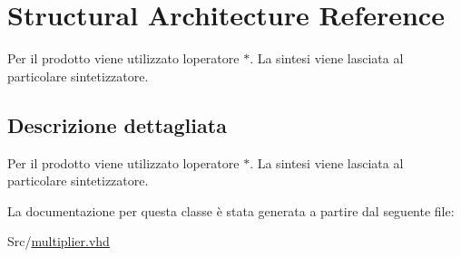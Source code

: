 \hypertarget{classmultiplier_1_1_structural}{}\section{Structural Architecture Reference}
\label{classmultiplier_1_1_structural}


Per il prodotto viene utilizzato l\textquotesingle{}operatore $\ast$. La sintesi viene lasciata al particolare sintetizzatore.  




\subsection{Descrizione dettagliata}
Per il prodotto viene utilizzato l\textquotesingle{}operatore $\ast$. La sintesi viene lasciata al particolare sintetizzatore. 

La documentazione per questa classe è stata generata a partire dal seguente file\+:\begin{DoxyCompactItemize}
\item 
Src/\hyperlink{multiplier_8vhd}{multiplier.\+vhd}\end{DoxyCompactItemize}
